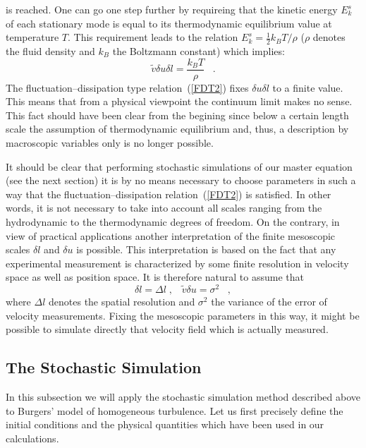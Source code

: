 is reached. One can go one step further by requireing that the
kinetic energy
$E_{k}^{s}$ of each stationary mode is equal to its thermodynamic
equilibrium value at temperature $T$. This requirement leads to
the relation
$E_{k}^{s} = \frac{1}{2} k_B T / \rho$ ($\rho$ denotes the
fluid density
and $k_{B}$ the Boltzmann constant) which implies:
\begin{equation}
\tilde{v} \delta u \delta l = \frac{k_B T}{\rho}
\;\;\; .   \label{FDT2}
\end{equation}
The fluctuation--dissipation type relation~(\ref{FDT2})
fixes $\delta u \delta l$
to a finite value. This means that from a physical viewpoint
the continuum limit makes no sense. This fact should have been clear
from the begining since below a certain length scale the assumption
of thermodynamic equilibrium and, thus, a description by
macroscopic variables only is no longer possible.

It should be clear that performing stochastic simulations
of our master equation (see the next section) it is by no means
necessary to choose parameters in such a way that the
fluctuation--dissipation relation~(\ref{FDT2}) is satisfied. In other
words, it is not necessary to take into account
all scales ranging from the hydrodynamic to the
thermodynamic degrees of freedom. On the contrary, 
in view of practical applications another interpretation of
the finite mesoscopic scales $\delta l$ and $\delta u$ is possible.
This interpretation is based on the fact that any experimental
measurement
is characterized by some finite resolution in velocity space as
well as position space. It is therefore natural to assume that
\[ \delta l = \Delta l \; , \;\;\;
\tilde{v} \delta u = \sigma^2  \;\;\; , \]
where $\Delta l$ denotes the spatial resolution and $\sigma^2$ the
variance of the error of velocity measurements. Fixing the
mesoscopic
parameters in this way, it might be possible to simulate
directly that
velocity field which is actually measured.

\subsection{The Stochastic Simulation}
In this subsection we will apply the stochastic simulation method
described above to Burgers' model of homogeneous turbulence.
Let us first
precisely define the initial conditions and the physical quantities
which have been used in our calculations.

